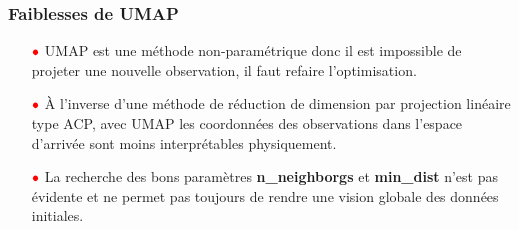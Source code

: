 \documentclass{beamer}
\theoremstyle{definition}
\begin{document}
\begin{frame}
	\frametitle{Faiblesses de UMAP}
	\begin{itemize}

		
		\item[$\textcolor{red}{\bullet}$] UMAP est une méthode non-paramétrique  donc il est impossible de projeter une nouvelle observation, il faut refaire l’optimisation.\\[0.5cm] 
		\item[$\textcolor{red}{\bullet}$] À l'inverse d'une méthode de réduction de dimension par projection linéaire type ACP, avec UMAP les coordonnées des observations dans l'espace d'arrivée sont moins interprétables physiquement.\\[0.5cm]  
		\item[$\textcolor{red}{\bullet}$] La recherche des bons paramètres \textbf{n\_neighborgs} et \textbf{min\_dist} n'est pas  évidente et ne permet pas toujours de rendre une vision globale des données initiales.  
	\end{itemize}
	
\end{frame}
\end{document}
